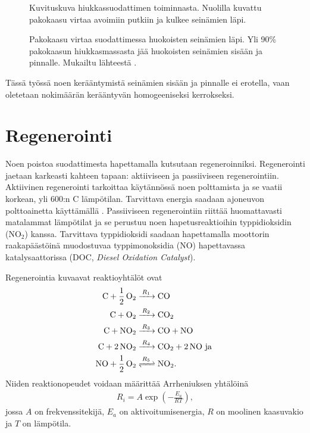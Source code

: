 \begin{figure}[H]
    \centering 
               {Kuvituskuva hiukkassuodattimen toiminnasta. Nuolilla kuvattu pakokaasu virtaa avoimiin putkiin ja kulkee seinämien läpi.}
    \caption{Pakokaasu virtaa suodattimessa huokoisten seinämien läpi. Yli 90\% pakokaasun hiukkasmassasta jää huokoisten seinämien sisään ja pinnalle. Mukailtu lähteestä \cite{dieselnet_dpf}.}
    \label{fig:wall-flow-dpf}
\end{figure}

Tässä työssä noen kerääntymistä seinämien sisään ja pinnalle ei erotella, vaan oletetaan nokimäärän kerääntyvän homogeeniseksi kerrokseksi.


\section{Regenerointi}
Noen poistoa suodattimesta hapettamalla kutsutaan regeneroinniksi. Regenerointi jaetaan karkeasti kahteen tapaan: aktiiviseen ja passiiviseen regenerointiin. 
Aktiivinen regenerointi tarkoittaa käytännössä noen polttamista ja se
vaatii korkean, yli 600:n \degree C lämpötilan. Tarvittava energia saadaan ajoneuvon polttoainetta käyttämällä \cite{dieselnet_dpf}. Passiiviseen regenerointiin riittää huomattavasti matalammat lämpötilat ja se perustuu noen hapetusreaktioihin typpidioksidin (NO\(_2\)) kanssa. Tarvittava typpidioksidi saadaan hapettamalla moottorin raakapäästöinä muodostuvaa typpimonoksidia (NO) hapettavassa katalysaattorissa (DOC, \emph{Diesel Oxidation Catalyst}).


Regenerointia kuvaavat reaktioyhtälöt ovat  
\begin{align}
    \ce{C + 1/2 O2 &->[$R_1$] CO }\label{req:regen_c2co}\\
    \ce{C + O2 &->[$R_2$] CO2}\label{req:regen_c2co2}\\
    \ce{C + NO2 &->[$R_3$] CO +  NO}  \\
    \ce{C + 2 NO2 &->[$R_4$] CO2 + 2 NO} \text{ ja }\\
    \ce{NO + 1/2 O2 &<=>[$R_5$] NO2}.
\end{align}
Niiden reaktionopeudet voidaan määrittää Arrheniuksen yhtälöinä \cite{LiuGuanlin2021Roio} \cite{Penghao_regen}
\begin{align}
    R_i =  A\exp\left({-\frac{E_a}{RT}}\right),
\end{align}
jossa \(A\) on frekvenssitekijä, \(E_a\) on aktivoitumisenergia, \(R\) on moolinen kaasuvakio ja \(T\) on lämpötila.


